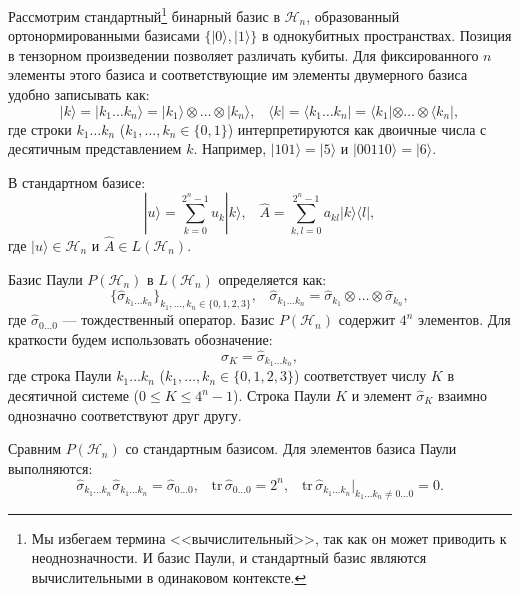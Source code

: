 \documentclass[a4paper]{report}
\begin{document}
Рассмотрим стандартный\footnote[1]{Мы избегаем термина <<вычислительный>>, так как он может приводить к неоднозначности. И базис Паули, и стандартный базис являются вычислительными в одинаковом контексте.} бинарный базис в ${\mathcal{H}_n}$, образованный ортонормированными базисами ${\{|0\rangle,|1\rangle\}}$ в однокубитных пространствах. Позиция в тензорном произведении позволяет различать кубиты. Для фиксированного ${n}$ элементы этого базиса и соответствующие им элементы двумерного базиса удобно записывать как:
$${
    |k\rangle = |k_1\ldots k_n\rangle = |k_1\rangle \otimes \ldots \otimes |k_n\rangle,\;\;\;
    \langle k| = \langle k_1\ldots k_n| = \langle k_1|\otimes\ldots\otimes\langle k_n|,
}$$
\noindent где строки ${k_1\ldots k_n}$ (${k_1,\ldots,k_n\in\{0, 1\}}$) интерпретируются как двоичные числа с десятичным представлением ${k}$. Например, ${|101\rangle = |5\rangle}$ и ${|00110\rangle = |6\rangle}$.

В стандартном базисе:
$${
    |u\rangle = \sum_{k=0}^{2^n - 1} u_k |k\rangle, \;\;\;
    \hat{A} = \sum_{k,l=0}^{2^n - 1} a_{kl} |k\rangle\langle l|,
}$$
\noindent где ${|u\rangle \in \mathcal{H}_n}$ и ${\hat{A} \in L(\mathcal{H}_n)}$.

Базис Паули ${P(\mathcal{H}_n)}$ в ${L(\mathcal{H}_n)}$ определяется как:
\begin{equation}\label{eq3}
    \{\hat{\sigma}_{k_1\ldots k_n}\}_{k_1,\ldots,k_n\in\{0,1,2,3\}},\;\;\;
    \hat{\sigma}_{k_1\ldots k_n} = \hat{\sigma}_{k_1}\otimes\ldots\otimes\hat{\sigma}_{k_n},
\end{equation}
\noindent где ${\hat{\sigma}_{0\ldots 0}}$ — тождественный оператор. Базис ${P(\mathcal{H}_n)}$ содержит ${4^n}$ элементов. Для краткости будем использовать обозначение:
$${
    \hat{\sigma}_K = \hat{\sigma}_{k_1\ldots k_n},
}$$
\noindent где строка Паули ${k_1\ldots k_n}$ (${k_1,\ldots,k_n \in \{0,1,2,3\}}$) соответствует числу ${K}$ в десятичной системе (${0 \leq K \leq 4^n - 1}$). Строка Паули ${K}$ и элемент ${\hat{\sigma}_K}$ взаимно однозначно соответствуют друг другу.

Сравним ${P(\mathcal{H}_n)}$ со стандартным базисом. Для элементов базиса Паули выполняются:
\begin{equation}\label{eq4}
    \hat{\sigma}_{k_1\ldots k_n} \hat{\sigma}_{k_1\ldots k_n} = \hat{\sigma}_{0\ldots 0}, \;\;\;
    \mathrm{tr}\,\hat{\sigma}_{0\ldots 0} = 2^n,\;\;\;
    \mathrm{tr}\,\hat{\sigma}_{k_1\ldots k_n}\Big|_{k_1\ldots k_n \neq 0\ldots0} = 0.
\end{equation}
\end{document}
